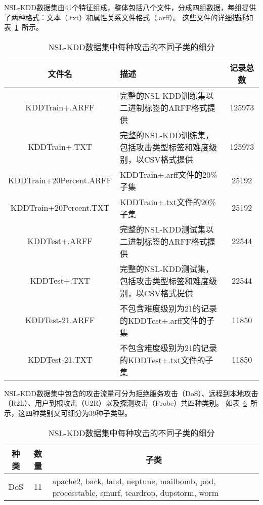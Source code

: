 \begin{table}[h]
\begin{table}[h]
NSL-KDD数据集由41个特征组成，整体包括八个文件，分成四组数据，每组提供了两种格式：文本（.txt）和属性关系文件格式（.arff）。
这些文件的详细描述如表~\ref{tab:NSLKDDFile}~所示。
\begin{table}[htbp]
	\caption{NSL-KDD数据集各文件介绍}
	\label{tab:NSLKDDFile}
	\begin{tabularx}{\textwidth}{cXc}
		\toprule
		\textbf{文件名}         & \textbf{描述}                                                  & \textbf{记录总数} \\
		\midrule
		KDDTrain+.ARFF          & 完整的NSL-KDD训练集以二进制标签的ARFF格式提供                  & 125973            \\
		KDDTrain+.TXT           & 完整的NSL-KDD训练集，包括攻击类型标签和难度级别，以CSV格式提供 & 125973            \\
		KDDTrain+20Percent.ARFF & KDDTrain+.arff文件的20\%子集                                   & 25192             \\
		KDDTrain+20Percent.TXT  & KDDTrain+.txt文件的20\%子集                                    & 25192             \\
		KDDTest+.ARFF           & 完整的NSL-KDD测试集以二进制标签的ARFF格式提供                  & 22544             \\
		KDDTest+.TXT            & 完整的NSL-KDD测试集，包括攻击类型标签和难度级别，以CSV格式提供 & 22544             \\
		KDDTest-21.ARFF         & 不包含难度级别为21的记录的KDDTest+.arff文件的子集              & 11850             \\
		KDDTest-21.TXT          & 不包含难度级别为21的记录的KDDTest+.txt文件的子集               & 11850             \\
		\bottomrule
	\end{tabularx}
\end{table}
NSL-KDD数据集中包含的攻击流量可分为拒绝服务攻击（DoS）、远程到本地攻击（R2L）、用户到根攻击（U2R）以及探测攻击（Probe）共四种类别。
如表~\ref{tab:attack_class}~所示，这四种类别又可细分为39种子类型。
\begin{table}[h]
	\caption{NSL-KDD数据集中每种攻击的不同子类的细分}
	\label{tab:attack_class}
	\begin{tabularx}{\textwidth}{@{}ccX@{}}
		\toprule
		\multicolumn{1}{c}{\textbf{种类}} & \multicolumn{1}{c}{\textbf{数量}} & \multicolumn{1}{c}{\textbf{子类}}                                                                                                                \\
		\midrule
		DoS                               & 11                                & apache2, back, land, neptune, mailbomb, pod, processtable, smurf, teardrop, dupstorm, worm                                                       \\

\end{tabularx}
\end{table}
\end{table}
\end{table}
